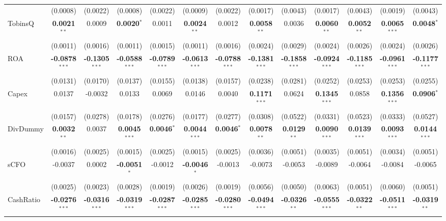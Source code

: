\documentclass[11pt,a4paper]{article}
\begin{document}
\begin{table}[htbp]
\begin{tabular}{lcccccccccccc}
 & (0.0008) & (0.0022) & (0.0008) & (0.0022) & (0.0009) & (0.0022) & (0.0017) & (0.0043) & (0.0017) & (0.0043) & (0.0019) & (0.0043) \\
TobinsQ & \textbf{0.0021}$^{**}$ & 0.0009 & \textbf{0.0020}$^{*}$ & 0.0011 & \textbf{0.0024}$^{**}$ & 0.0012 & \textbf{0.0058}$^{**}$ & 0.0036 & \textbf{0.0060}$^{**}$ & \textbf{0.0052}$^{**}$ & \textbf{0.0065}$^{***}$ & \textbf{0.0048}$^{*}$ \\
 & (0.0011) & (0.0016) & (0.0011) & (0.0015) & (0.0011) & (0.0016) & (0.0024) & (0.0029) & (0.0024) & (0.0026) & (0.0024) & (0.0026) \\
ROA & \textbf{-0.0878}$^{***}$ & \textbf{-0.1305}$^{***}$ & \textbf{-0.0588}$^{***}$ & \textbf{-0.0789}$^{***}$ & \textbf{-0.0613}$^{***}$ & \textbf{-0.0788}$^{***}$ & \textbf{-0.1381}$^{***}$ & \textbf{-0.1858}$^{***}$ & \textbf{-0.0924}$^{***}$ & \textbf{-0.1185}$^{***}$ & \textbf{-0.0961}$^{***}$ & \textbf{-0.1177}$^{***}$ \\
 & (0.0131) & (0.0170) & (0.0137) & (0.0155) & (0.0138) & (0.0157) & (0.0238) & (0.0281) & (0.0252) & (0.0253) & (0.0253) & (0.0255) \\
Capex & 0.0137 & -0.0032 & 0.0133 & 0.0069 & 0.0146 & 0.0040 & \textbf{0.1171}$^{***}$ & 0.0624 & \textbf{0.1345}$^{***}$ & 0.0858 & \textbf{0.1356}$^{***}$ & \textbf{0.0906}$^{*}$ \\
 & (0.0157) & (0.0278) & (0.0178) & (0.0276) & (0.0177) & (0.0277) & (0.0308) & (0.0522) & (0.0331) & (0.0523) & (0.0333) & (0.0527) \\
DivDummy & \textbf{0.0032}$^{**}$ & 0.0037 & \textbf{0.0045}$^{***}$ & \textbf{0.0046}$^{*}$ & \textbf{0.0044}$^{***}$ & \textbf{0.0046}$^{*}$ & \textbf{0.0078}$^{**}$ & \textbf{0.0129}$^{**}$ & \textbf{0.0090}$^{***}$ & \textbf{0.0139}$^{***}$ & \textbf{0.0093}$^{***}$ & \textbf{0.0144}$^{***}$ \\
 & (0.0016) & (0.0025) & (0.0015) & (0.0025) & (0.0015) & (0.0025) & (0.0036) & (0.0051) & (0.0035) & (0.0051) & (0.0034) & (0.0051) \\
sCFO & -0.0037 & 0.0002 & \textbf{-0.0051}$^{*}$ & -0.0012 & \textbf{-0.0046}$^{*}$ & -0.0013 & -0.0073 & -0.0053 & -0.0089 & -0.0064 & -0.0084 & -0.0065 \\
 & (0.0025) & (0.0023) & (0.0028) & (0.0019) & (0.0026) & (0.0019) & (0.0056) & (0.0050) & (0.0063) & (0.0051) & (0.0060) & (0.0051) \\
CashRatio & \textbf{-0.0276}$^{***}$ & \textbf{-0.0316}$^{***}$ & \textbf{-0.0319}$^{***}$ & \textbf{-0.0287}$^{***}$ & \textbf{-0.0285}$^{***}$ & \textbf{-0.0280}$^{***}$ & \textbf{-0.0494}$^{***}$ & \textbf{-0.0326}$^{**}$ & \textbf{-0.0555}$^{***}$ & \textbf{-0.0322}$^{**}$ & \textbf{-0.0511}$^{***}$ & \textbf{-0.0319}$^{**}$ \\

\end{tabular}
\end{table}
\end{document}
